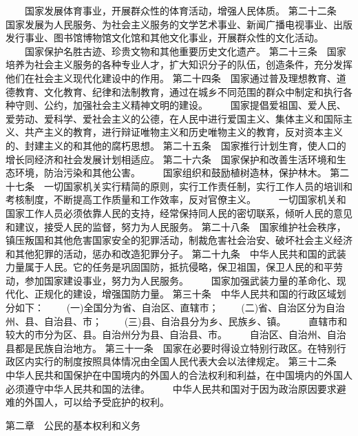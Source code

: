 　　国家发展体育事业，开展群众性的体育活动，增强人民体质。
     第二十二条　国家发展为人民服务、为社会主义服务的文学艺术事业、新闻广播电视事业、出版发行事业、图书馆博物馆文化馆和其他文化事业，开展群众性的文化活动。
　　国家保护名胜古迹、珍贵文物和其他重要历史文化遗产。
     第二十三条　国家培养为社会主义服务的各种专业人才，扩大知识分子的队伍，创造条件，充分发挥他们在社会主义现代化建设中的作用。
     第二十四条　国家通过普及理想教育、道德教育、文化教育、纪律和法制教育，通过在城乡不同范围的群众中制定和执行各种守则、公约，加强社会主义精神文明的建设。
 　　国家提倡爱祖国、爱人民、爱劳动、爱科学、爱社会主义的公德，在人民中进行爱国主义、集体主义和国际主义、共产主义的教育，进行辩证唯物主义和历史唯物主义的教育，反对资本主义的、封建主义的和其他的腐朽思想。
     第二十五条　国家推行计划生育，使人口的增长同经济和社会发展计划相适应。
     第二十六条　国家保护和改善生活环境和生态环境，防治污染和其他公害。
　　国家组织和鼓励植树造林，保护林木。
     第二十七条　一切国家机关实行精简的原则，实行工作责任制，实行工作人员的培训和考核制度，不断提高工作质量和工作效率，反对官僚主义。
 　　一切国家机关和国家工作人员必须依靠人民的支持，经常保持同人民的密切联系，倾听人民的意见和建议，接受人民的监督，努力为人民服务。
     第二十八条　国家维护社会秩序，镇压叛国和其他危害国家安全的犯罪活动，制裁危害社会治安、破坏社会主义经济和其他犯罪的活动，惩办和改造犯罪分子。
     第二十九条　中华人民共和国的武装力量属于人民。它的任务是巩固国防，抵抗侵略，保卫祖国，保卫人民的和平劳动，参加国家建设事业，努力为人民服务。
　　国家加强武装力量的革命化、现代化、正规化的建设，增强国防力量。
     第三十条　中华人民共和国的行政区域划分如下：
　　(一)全国分为省、自治区、直辖市；
　　(二)省、自治区分为自治州、县、自治县、市；
　　(三)县、自治县分为乡、民族乡、镇。
　　直辖市和较大的市分为区、县。自治州分为县、自治县、市。
　　自治区、自治州、自治县都是民族自治地方。
     第三十一条　国家在必要时得设立特别行政区。在特别行政区内实行的制度按照具体情况由全国人民代表大会以法律规定。
     第三十二条　中华人民共和国保护在中国境内的外国人的合法权利和利益，在中国境内的外国人必须遵守中华人民共和国的法律。
　　中华人民共和国对于因为政治原因要求避难的外国人，可以给予受庇护的权利。
     
第二章　公民的基本权利和义务
     
